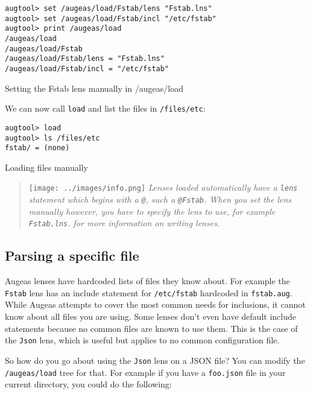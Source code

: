  

\begin{listing}
  \begin{verbatim}
augtool> set /augeas/load/Fstab/lens "Fstab.lns"
augtool> set /augeas/load/Fstab/incl "/etc/fstab"
augtool> print /augeas/load
/augeas/load
/augeas/load/Fstab
/augeas/load/Fstab/lens = "Fstab.lns"
/augeas/load/Fstab/incl = "/etc/fstab"
  \end{verbatim}
  \caption{Setting the Fstab lens manually in /augeas/load}
  \label{lst:metadata_setting_lens_manually}
\end{listing}

We can now call \verb!load! and list the files in \verb!/files/etc!:

 

\begin{listing}
  \begin{verbatim}
augtool> load
augtool> ls /files/etc
fstab/ = (none)
  \end{verbatim}
  \caption{Loading files manually}
  \label{lst:metadata_call_load}
\end{listing}

\begin{quote}
\texttt{[image: ../images/info.png]} \emph{Lenses loaded automatically have a \texttt{lens} statement which begins with a \texttt{@}, such a \texttt{@Fstab}. When you set the lens manually however, you have to specify the lens to use, for example \texttt{Fstab.lns}.  for more information on writing lenses.}

\end{quote}
\subsection{Parsing a specific file}

Augeas lenses have hardcoded lists of files they know about. For example the \verb!Fstab! lens has an include statement for \verb!/etc/fstab! hardcoded in \verb!fstab.aug!. While Augeas attempts to cover the most common needs for inclusions, it cannot know about all files you are using. Some lenses don't even have default include statements because no common files are known to use them. This is the case of the \verb!Json! lens, which is useful but applies to no common configuration file.

So how do you go about using the \verb!Json! lens on a JSON file? You can modify the \verb!/augeas/load! tree for that. For example if you have a \verb!foo.json! file in your current directory, you could do the following:

